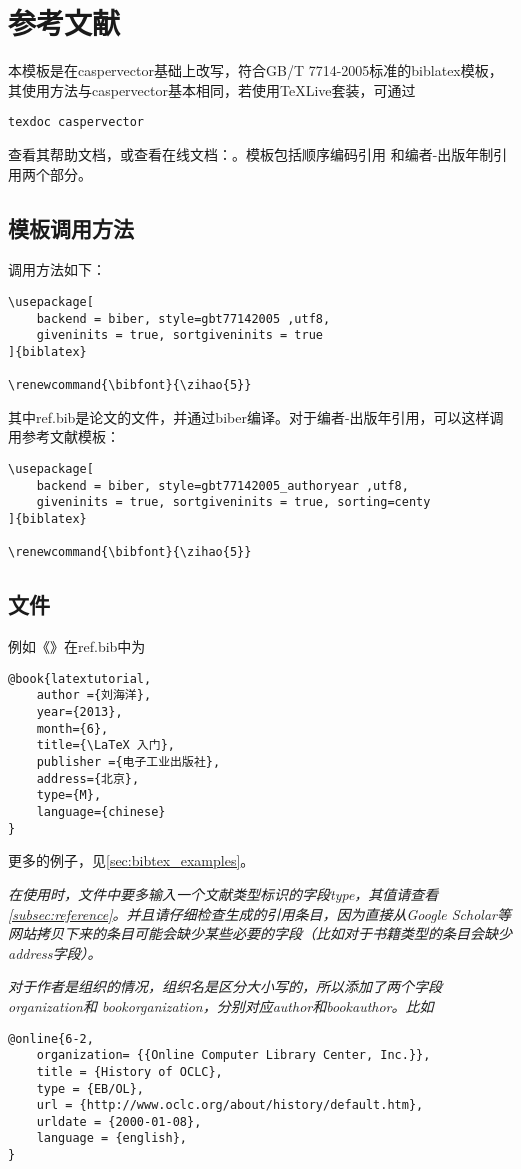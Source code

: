 \documentclass[oneside]{LZU}
\renewcommand{\bibfont}{\zihao{5}}
\newenvironment{note}{\par\itshape\noindent{\makebox[-5pt][r]{\scriptsize\color{red!90}\textdbend\quad}}}{\par}
\newcommand{\filename}[1]{{\ttfamily #1}}
\newcommand{\package}[1]{{\sffamily #1}}
\begin{document}
\section{参考文献}
本模板是在caspervector\autocite{caspervector}基础上改写，符合GB/T 7714-2005标准\autocite{gbt7714-2005}的\package{biblatex}\autocite{biblatex}模板，其使用方法与caspervector基本相同，若使用TeXLive套装，可通过
\begin{verbatim}
texdoc caspervector
\end{verbatim}
查看其帮助文档，或查看在线文档：\cite[引用][]{caspervector}。模板包括顺序编码引用
和编者-出版年制引用两个部分。
\subsection{模板调用方法}
调用方法如下：
\begin{verbatim}
\usepackage[
    backend = biber, style=gbt77142005 ,utf8,
    giveninits = true, sortgiveninits = true
]{biblatex}

\renewcommand{\bibfont}{\zihao{5}}
\end{verbatim}
其中\filename{ref.bib}是论文的文件，并通过biber\autocite{biber}编译。对于编者-出版年引用，可以这样调用参考文献模板：
\begin{verbatim}
\usepackage[
    backend = biber, style=gbt77142005_authoryear ,utf8,
    giveninits = true, sortgiveninits = true, sorting=centy
]{biblatex}

\renewcommand{\bibfont}{\zihao{5}}
\end{verbatim}
\subsection{文件}
例如《》\supercite{latextutorial}在\filename{ref.bib}中为
\begin{verbatim}
@book{latextutorial,
    author ={刘海洋},
    year={2013},
    month={6},
    title={\LaTeX 入门},
    publisher ={电子工业出版社},
    address={北京},
    type={M},
    language={chinese}
}
\end{verbatim}
更多的例子，见\cref{sec:bibtex_examples}。
\begin{note}
    在使用时，文件中要多输入一个文献类型标识的字段type，其值请查看\cref{subsec:reference}。并且请仔细检查生成的引用条目，因为直接从Google Scholar等网站拷贝下来的条目可能会缺少某些必要的字段（比如对于书籍类型的条目会缺少address字段）。
\end{note}
\begin{note}
对于作者是组织的情况，组织名是区分大小写的，所以添加了两个字段organization和
bookorganization，分别对应author和bookauthor。比如
\begin{verbatim}
@online{6-2,
    organization= {{Online Computer Library Center, Inc.}},
    title = {History of OCLC},
    type = {EB/OL},
    url = {http://www.oclc.org/about/history/default.htm},
    urldate = {2000-01-08},
    language = {english},
}
\end{verbatim}
\end{note}
\end{document}
